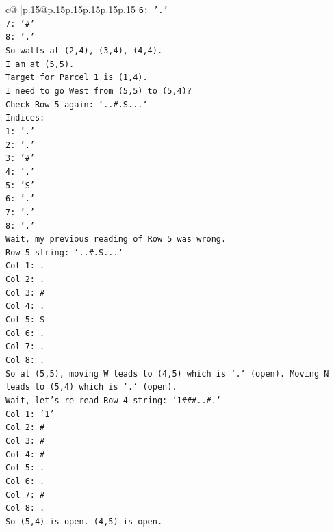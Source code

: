 \documentclass{article}
\begin{document}
{\begin{supertabular}{c@{$\;$}|p{.15\linewidth}@{}p{.15\linewidth}p{.15\linewidth}p{.15\linewidth}p{.15\linewidth}p{.15\linewidth}}
{{{\texttt{6: '.'} \\
\texttt{7: '\#'} \\
\texttt{8: '.'} \\
\texttt{So walls at (2,4), (3,4), (4,4).} \\
\texttt{I am at (5,5).} \\
\texttt{Target for Parcel 1 is (1,4).} \\
\texttt{I need to go West from (5,5) to (5,4)?} \\
\texttt{Check Row 5 again: `..\#.S...`} \\
\texttt{Indices:} \\
\texttt{1: '.'} \\
\texttt{2: '.'} \\
\texttt{3: '\#'} \\
\texttt{4: '.'} \\
\texttt{5: 'S'} \\
\texttt{6: '.'} \\
\texttt{7: '.'} \\
\texttt{8: '.'} \\
\texttt{Wait, my previous reading of Row 5 was wrong.} \\
\texttt{Row 5 string: `..\#.S...`} \\
\texttt{Col 1: .} \\
\texttt{Col 2: .} \\
\texttt{Col 3: \#} \\
\texttt{Col 4: .} \\
\texttt{Col 5: S} \\
\texttt{Col 6: .} \\
\texttt{Col 7: .} \\
\texttt{Col 8: .} \\
\texttt{So at (5,5), moving W leads to (4,5) which is `.` (open). Moving N leads to (5,4) which is `.` (open).} \\
\texttt{Wait, let's re{-}read Row 4 string: `1\#\#\#..\#.`} \\
\texttt{Col 1: '1'} \\
\texttt{Col 2: \#} \\
\texttt{Col 3: \#} \\
\texttt{Col 4: \#} \\
\texttt{Col 5: .} \\
\texttt{Col 6: .} \\
\texttt{Col 7: \#} \\
\texttt{Col 8: .} \\
\texttt{So (5,4) is open. (4,5) is open.} \\
}}}
\end{supertabular}}
\end{document}
